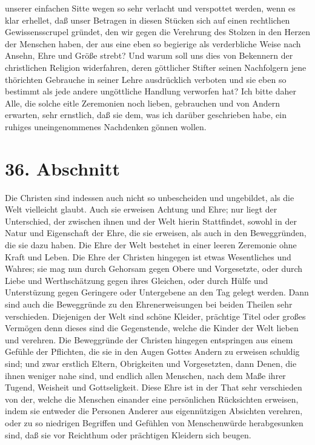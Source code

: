 unserer einfachen Sitte wegen so sehr verlacht und verspottet werden, wenn es
klar erhellet, daß unser Betragen in diesen Stücken sich auf einen rechtlichen
Gewissensscrupel gründet, den wir gegen die Verehrung des Stolzen in den Herzen
der Menschen haben, der aus eine eben so begierige als verderbliche Weise nach
Ansehn, Ehre und Größe strebt? Und warum soll uns dies von Bekennern der
christlichen Religion widerfahren, deren göttlicher Stifter seinen Nachfolgern
jene thörichten Gebrauche in seiner Lehre ausdrücklich verboten und sie eben so
bestimmt als jede andere ungöttliche Handlung verworfen hat? Ich bitte daher
Alle, die solche eitle Zeremonien noch lieben, gebrauchen und von Andern
erwarten, sehr ernstlich, daß sie dem, was ich darüber geschrieben habe, ein
ruhiges uneingenommenes  Nachdenken gönnen wollen.

\section{36. Abschnitt} \label{kap9_ab36}

Die Christen sind indessen auch nicht so unbescheiden und ungebildet, als die
Welt vielleicht glaubt. Auch sie erweisen Achtung und Ehre; nur liegt der
Unterschied, der zwischen ihnen und der Welt hierin Stattfindet, sowohl in der
Natur und Eigenschaft der Ehre, die sie erweisen, als auch in den Beweggründen,
die sie dazu haben. Die Ehre der Welt bestehet in einer leeren Zeremonie ohne
Kraft und Leben. Die Ehre der Christen hingegen ist etwas Wesentliches und
Wahres; sie mag nun durch Gehorsam gegen Obere und Vorgesetzte, oder durch Liebe
und Werthschätzung gegen ihres Gleichen, oder durch Hülfe und Unterstüzung gegen
Geringere oder Untergebene an den Tag gelegt werden. Dann sind auch die
Beweggründe zu den Ehrenerweisungen bei beiden Theilen sehr verschieden.
Diejenigen der Welt sind schöne Kleider, prächtige Titel oder großes Vermögen
denn dieses sind die Gegenstende, welche die Kinder der Welt lieben und
verehren. Die Beweggründe der Christen hingegen entspringen aus einem Gefühle
der Pflichten, die sie in den Augen Gottes Andern zu erweisen schuldig sind; und
zwar erstlich Eltern, Obrigkeiten und Vorgesetzten, dann Denen, die ihnen
weniger nahe sind, und endlich allen Menschen, nach dem Maße ihrer Tugend,
Weisheit und Gottseligkeit. Diese Ehre ist in der That sehr verschieden von der,
welche die Menschen einander eine persönlichen Rücksichten erweisen, indem sie
entweder die Personen Anderer aus eigennützigen Absichten verehren, oder zu so
niedrigen Begriffen und Gefühlen von Menschenwürde herabgesunken sind, daß sie
vor Reichthum oder prächtigen Kleidern sich beugen.

